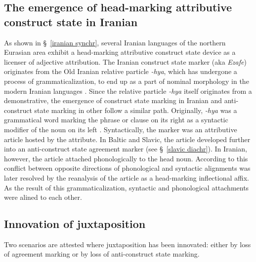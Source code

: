 {\subsection[Head-marking attributive construct state]{The emergence of head-marking attributive construct state in Iranian}\label{iranian diachr}
As shown in \S~\ref{iranian synchr}, several Iranian languages of the northern Eurasian area exhibit a head-marking attributive construct state device as a licenser of adjective attribution. The Iranian construct state marker (aka \textit{Ezafe}) originates from the Old Iranian relative particle \textit{-hya}, which has undergone a process of grammaticalization, to end up as a part of nominal morphology in the modern Iranian languages \citep{haider-etal1984,samvelian2007b}. Since the  relative particle \textit{-hya} itself originates from a demonstrative, the emergence of construct state marking in Iranian and anti-construct state marking in other  follow a similar path. Originally, \textit{-hya} was a grammatical word marking the phrase or clause on its right as a syntactic modifier of the noun on its left \citep{haider-etal1984}. Syntactically, the marker was an attributive article hosted by the attribute. In Baltic and Slavic, the article developed further into an anti-construct state agreement marker (see \S~\ref{slavic diachr}). In Iranian, however, the article attached phonologically to the head noun. According to \citet[3]{samvelian2007} this conflict between opposite directions of phonological and syntactic alignments was later resolved by the reanalysis of the article as a head-marking inflectional affix. As the result of this grammaticalization, syntactic and phonological attachments were alined to each other.

\subsection[Innovation of juxtaposition]{Innovation of juxtaposition}
Two scenarios are attested where juxtaposition has been innovated: either by loss of agreement marking or by loss of anti-construct state marking.

}
